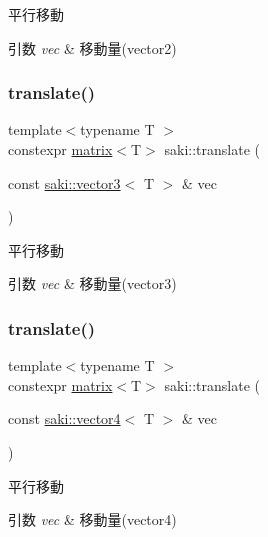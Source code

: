 平行移動 


\begin{DoxyParams}{引数}
{\em vec} & 移動量(vector2) \\
\hline
\end{DoxyParams}
\mbox{\label{namespacesaki_a492418470fa4dedb2065e7916460f0e0}} 
\subsubsection{\texorpdfstring{translate()}{translate()}\hspace{0.1cm}{\footnotesize\ttfamily [2/3]}}
{\footnotesize\ttfamily template$<$typename T $>$ \\
constexpr \mbox{\hyperlink{classsaki_1_1matrix}{matrix}}$<$T$>$ saki\+::translate (\begin{DoxyParamCaption}\item[{const \mbox{\hyperlink{classsaki_1_1vector3}{saki\+::vector3}}$<$ T $>$ \&}]{vec }\end{DoxyParamCaption})}



平行移動 


\begin{DoxyParams}{引数}
{\em vec} & 移動量(vector3) \\
\hline
\end{DoxyParams}
\mbox{\label{namespacesaki_abdd23c2e56d1500ae2e8b662c5ddcf7c}} 
\subsubsection{\texorpdfstring{translate()}{translate()}\hspace{0.1cm}{\footnotesize\ttfamily [3/3]}}
{\footnotesize\ttfamily template$<$typename T $>$ \\
constexpr \mbox{\hyperlink{classsaki_1_1matrix}{matrix}}$<$T$>$ saki\+::translate (\begin{DoxyParamCaption}\item[{const \mbox{\hyperlink{classsaki_1_1vector4}{saki\+::vector4}}$<$ T $>$ \&}]{vec }\end{DoxyParamCaption})}



平行移動 


\begin{DoxyParams}{引数}
{\em vec} & 移動量(vector4) \\
\hline
\end{DoxyParams}
